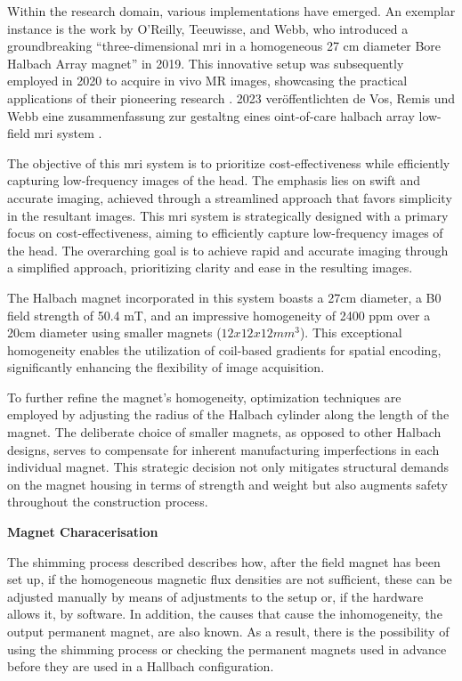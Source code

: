 Within the research domain, various implementations have emerged. An
exemplar instance is the work by O'Reilly, Teeuwisse, and Webb, who
introduced a groundbreaking ``three-dimensional \gls{mri} in a
homogeneous 27 cm diameter Bore Halbach Array magnet''
\cite{OReilly2019-rn} in 2019. This innovative setup was
subsequently employed in 2020 to acquire in vivo MR images, showcasing
the practical applications of their pioneering research
\cite{OReilly2021-ep}. 2023 veröffentlichten de Vos, Remis und Webb
eine zusammenfassung zur gestaltng eines oint-of-care halbach array
low-field \gls{mri} system \cite{De_Vos2023-pb}.

The objective of this \gls{mri} system is to prioritize
cost-effectiveness while efficiently capturing low-frequency images of
the head. The emphasis lies on swift and accurate imaging, achieved
through a streamlined approach that favors simplicity in the resultant
images. This \gls{mri} system is strategically designed with a primary
focus on cost-effectiveness, aiming to efficiently capture low-frequency
images of the head. The overarching goal is to achieve rapid and
accurate imaging through a simplified approach, prioritizing clarity and
ease in the resulting images.

The Halbach magnet incorporated in this system boasts a 27cm diameter, a
B0 field strength of 50.4 mT, and an impressive homogeneity of 2400 ppm
over a 20cm diameter using smaller magnets (\(12 x 12 x 12 mm^3\)). This
exceptional homogeneity enables the utilization of coil-based gradients
for spatial encoding, significantly enhancing the flexibility of image
acquisition.

To further refine the magnet's homogeneity, optimization techniques are
employed by adjusting the radius of the Halbach cylinder along the
length of the magnet. The deliberate choice of smaller magnets, as
opposed to other Halbach designs, serves to compensate for inherent
manufacturing imperfections in each individual magnet. This strategic
decision not only mitigates structural demands on the magnet housing in
terms of strength and weight but also augments safety throughout the
construction process.

\textbf{Magnet Characerisation}

The shimming process described describes how, after the field magnet has
been set up, if the homogeneous magnetic flux densities are not
sufficient, these can be adjusted manually by means of adjustments to
the setup or, if the hardware allows it, by software. In addition, the
causes that cause the inhomogeneity, the output permanent magnet, are
also known. As a result, there is the possibility of using the shimming
process or checking the permanent magnets used in advance before they
are used in a Hallbach configuration.

